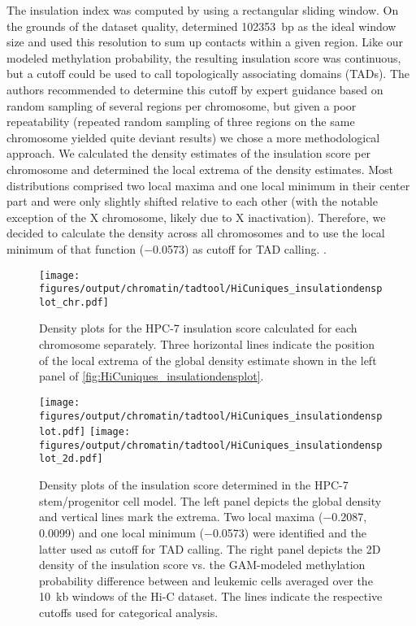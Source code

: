 The insulation index was computed by  using a rectangular sliding window. On the grounds of the dataset quality,  determined \SI{102353}{bp} as the ideal window size and used this resolution to sum up contacts within a given region. Like our modeled methylation probability, the resulting insulation score was continuous, but a cutoff could be used to call topologically associating domains (TADs). The  authors recommended to determine this cutoff by expert guidance based on random sampling of several regions per chromosome, but given a poor repeatability (repeated random sampling of three regions on the same chromosome yielded quite deviant results) we chose a more methodological approach. We calculated the density estimates of the insulation score per chromosome  and determined the local extrema of the density estimates. Most distributions comprised two local maxima and one local minimum in their center part and were only slightly shifted relative to each other (with the notable exception of the X chromosome, likely due to X inactivation). Therefore, we decided to calculate the density across all chromosomes and to use the local minimum of that function (\num{-0.0573}) as cutoff for TAD calling. . 

\begin{figure}[!ht]
	\centering
	\texttt{[image: figures/output/chromatin/tadtool/HiCuniques\_insulationdensplot\_chr.pdf]}
	\caption{Density plots for the HPC-7 insulation score calculated for each chromosome separately. Three horizontal lines indicate the position of the local extrema of the global density estimate shown in the left panel of \autoref{fig:HiCuniques_insulationdensplot}.}
	\label{fig:HiCuniques_insulationdensplot_chr}
\end{figure}

\begin{figure}[!ht]
	\centering
	\texttt{[image: figures/output/chromatin/tadtool/HiCuniques\_insulationdensplot.pdf]}
	\texttt{[image: figures/output/chromatin/tadtool/HiCuniques\_insulationdensplot\_2d.pdf]}
	\caption{Density plots of the insulation score determined in the HPC-7 stem/progenitor cell model. The left panel depicts the global density and vertical lines mark the extrema. Two local maxima (\num{-0.2087}, \num{0.0099}) and one local minimum (\num{-0.0573}) were identified and the latter used as cutoff for TAD calling. The right panel depicts the 2D density of the insulation score vs. the GAM-modeled methylation probability difference between \dnmtchip and \dnmtwt \kitpos leukemic cells averaged over the \SI{10}{\kilo b} windows of the Hi-C dataset. The lines indicate the respective cutoffs used for categorical analysis.}
	\label{fig:HiCuniques_insulationdensplot}
\end{figure}

